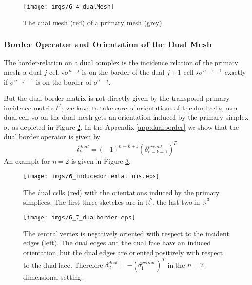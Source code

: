 \begin{figure}%
\begin{center}
\texttt{[image: imgs/6\_4\_dualMesh]}
\end{center}
\caption{The dual mesh (red) of a primary mesh (grey)}%
\label{fig:6_dualmesh}%
\end{figure}

\subsubsection{Border Operator and Orientation of the Dual Mesh}

The border-relation on a dual complex is the incidence relation of the primary mesh; a dual $j$ cell $\star \sigma^{n-j}$ is on the border of the dual $j+1$-cell $\star \sigma^{n-j-1}$ exactly if $\sigma^{n-j-1}$ is on the border of $\sigma^{n-j}$.

But the dual border-matrix is not directly given by the transposed primary incidence matrix $\delta^T$; we have to take care of orientations of the dual cells, as a dual cell $\star \sigma$ on the dual mesh gets an orientation induced by the primary simplex $\sigma$, as depicted in Figure \ref{fig:6_inducedorientations}.
In the Appendix \ref{app:dualborder} we show that the dual border operator is given by
\begin{equation}\delta_{k}^{dual} = (-1)^{n-k+1} (\delta_{n-k+1}^{primal})^T\label{eq:dualBorderOp}\end{equation}
An example for $n=2$ is given in Figure \ref{fig:6_dualborder}.

\begin{figure}%
\texttt{[image: imgs/6\_inducedorientations.eps]}
\caption{The dual cells (red) with the orientations induced by the primary simplices. The first three sketches are in $\mathbb R^2$, the last two in $\mathbb R^3$}%
\label{fig:6_inducedorientations}%
\end{figure}

\begin{figure}%
\begin{center}
\texttt{[image: imgs/6\_7\_dualborder.eps]}%
\end{center}
\caption{The central vertex is negatively oriented with respect to the incident edges (left). The dual edges and the dual face have an induced orientation, but the dual edges are oriented positively with respect to the dual face. Therefore $\delta_{2}^{dual} = - (\delta_1^{primal})^T$ in the $n=2$ dimensional setting.}%
\label{fig:6_dualborder}%
\end{figure}

